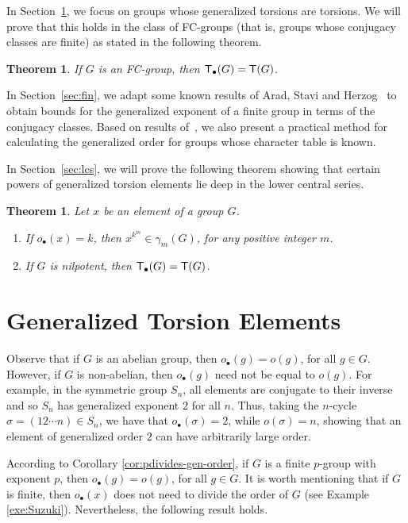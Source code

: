 \documentclass[12pt,leqno]{amsart}
\newcommand{\T}{{\sf T}}
\newcommand{\Tg}{{\sf T_{\bullet}}}
\newtheorem{thm}[theorem]{\sc Theorem}
\theoremstyle{definition}
\begin{document}
In Section~\ref{sec:gen}, we focus on groups whose generalized torsions are torsions. We will prove that this holds in the class of FC-groups 
(that is, groups whose conjugacy classes are finite) as stated in 
the following theorem.

\begin{thm} \label{thm_FC}
If $G$ is an FC-group, then $\Tg(G) = \T (G)$.     
\end{thm}

In Section~\ref{sec:fin}, we adapt some known results of Arad, Stavi and Herzog~\cite{ASH} to obtain bounds for the generalized exponent of a finite group
in terms of the conjugacy classes. Based on results of~\cite{ASH}, we also present a practical method for calculating the generalized order for  groups whose character table is known.



In Section~\ref{sec:lcs}, we will prove the following theorem showing that certain powers of generalized torsion elements lie deep in the lower central series.



\begin{thm} \label{thm:nilpotent}
Let $x$ be an element of a group  $G$.
\begin{enumerate}
    \item If $o_{\bullet}(x)=k$, then $x^{k^{m}} \in \gamma_{m}(G)$, for any positive integer $m$.
    \item If $G$ is nilpotent, then $\Tg(G) = \T (G)$. 
\end{enumerate}
\end{thm}



\section{Generalized Torsion Elements}\label{sec:gen}

Observe that if $G$ is an abelian group, then $o_{\bullet}(g)=o(g)$, for all $g \in G$. However,  if $G$ is non-abelian, then $o_{\bullet}(g)$ need not be equal to $o(g)$. 
For example, in the symmetric group $S_n$, all elements are conjugate to their inverse and so $S_n$ has generalized exponent $2$ for all $n$. Thus, 
taking the $n$-cycle $\sigma=(12\cdots n)\in S_n$, we have that $o_{\bullet}(\sigma)=2$, while $o(\sigma)=n$, showing that an element of generalized order $2$ can have arbitrarily large order.


According to  Corollary \ref{cor:pdivides-gen-order}, if $G$ is a finite $p$-group with exponent $p$, then $o_{\bullet}(g) = o(g)$, for all $g\in G$. It is worth mentioning that if $G$ is finite, then $o_{\bullet}(x)$ does not need to divide the order of $G$ (see Example \ref{exe:Suzuki}). 
Nevertheless, the following result holds.
\end{document}
